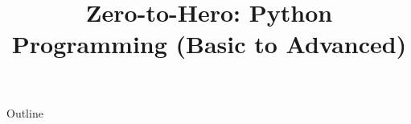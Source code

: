 \documentclass[xcolor=dvipsnames,compress,t,pdf]{beamer}
\title[\insertframenumber /\inserttotalframenumber]{Zero-to-Hero: Python Programming (Basic to Advanced)}
\begin{document}
	\begin{frame}
	\titlepage
	\end{frame}

	\begin{frame}{Outline}
	    \tableofcontents
	\end{frame}

	
	
	
\end{document}
